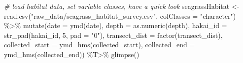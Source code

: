 \documentclass[
]{book}
\newenvironment{Shaded}{\begin{snugshade}}{\end{snugshade}}
\newcommand{\AttributeTok}[1]{\textcolor[rgb]{0.77,0.63,0.00}{#1}}
\newcommand{\CommentTok}[1]{\textcolor[rgb]{0.56,0.35,0.01}{\textit{#1}}}
\newcommand{\DecValTok}[1]{\textcolor[rgb]{0.00,0.00,0.81}{#1}}
\newcommand{\FunctionTok}[1]{\textcolor[rgb]{0.00,0.00,0.00}{#1}}
\newcommand{\NormalTok}[1]{#1}
\newcommand{\OtherTok}[1]{\textcolor[rgb]{0.56,0.35,0.01}{#1}}
\newcommand{\SpecialCharTok}[1]{\textcolor[rgb]{0.00,0.00,0.00}{#1}}
\newcommand{\StringTok}[1]{\textcolor[rgb]{0.31,0.60,0.02}{#1}}
\begin{document}
\begin{Shaded}
\begin{Highlighting}[]
\CommentTok{\# load habitat data, set variable classes, have a quick look}
\NormalTok{seagrassHabitat }\OtherTok{\textless{}{-}}
  \FunctionTok{read.csv}\NormalTok{(}\StringTok{"raw\_data/seagrass\_habitat\_survey.csv"}\NormalTok{,}
           \AttributeTok{colClasses =} \StringTok{"character"}\NormalTok{) }\SpecialCharTok{\%\textgreater{}\%}  
  \FunctionTok{mutate}\NormalTok{(}\AttributeTok{date            =} \FunctionTok{ymd}\NormalTok{(date),}
         \AttributeTok{depth           =} \FunctionTok{as.numeric}\NormalTok{(depth),}
         \AttributeTok{hakai\_id        =} \FunctionTok{str\_pad}\NormalTok{(hakai\_id, }\DecValTok{5}\NormalTok{, }\AttributeTok{pad =} \StringTok{"0"}\NormalTok{),}
         \AttributeTok{transect\_dist   =} \FunctionTok{factor}\NormalTok{(transect\_dist),}
         \AttributeTok{collected\_start =} \FunctionTok{ymd\_hms}\NormalTok{(collected\_start),}
         \AttributeTok{collected\_end   =} \FunctionTok{ymd\_hms}\NormalTok{(collected\_end)) }\SpecialCharTok{\%T\textgreater{}\%}
  \FunctionTok{glimpse}\NormalTok{()}
\end{Highlighting}
\end{Shaded}
\end{document}
